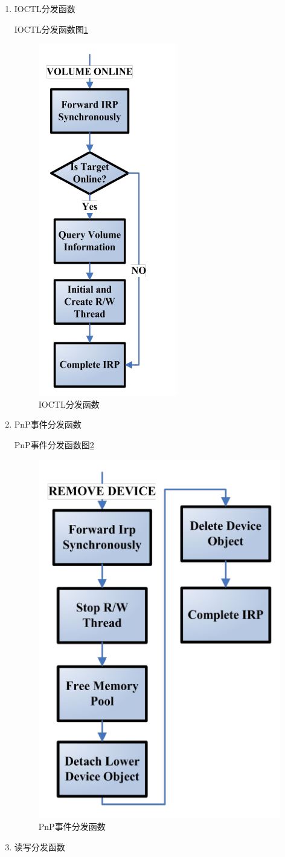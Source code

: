 \begin{enumerate}
\item IOCTL分发函数

IOCTL分发函数图\ref{fig:df-ioctl}

\begin{figure}[h]
\centering
\includegraphics[width=0.3\linewidth]{./graph/df-ioctl}
\caption{IOCTL分发函数}
\label{fig:df-ioctl}
\end{figure}

\item PnP事件分发函数

PnP事件分发函数图\ref{fig:df-pnp}

\begin{figure}[h]
\centering
\includegraphics[width=0.4\linewidth]{./graph/df-pnp}
\caption{PnP事件分发函数}
\label{fig:df-pnp}
\end{figure}

\item 读写分发函数


\end{enumerate}

